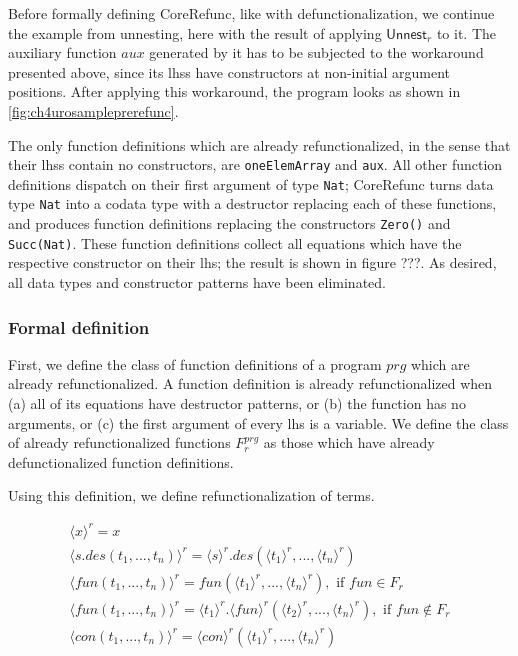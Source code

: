 Before formally defining \textsf{CoreRefunc}, like with defunctionalization, we continue the example from unnesting, here with the result of applying $\textsf{Unnest}_r$ to it. The auxiliary function $aux$ generated by it has to be subjected to the workaround presented above, since its lhss have constructors at non-initial argument positions. After applying this workaround, the program looks as shown in \autoref{fig:ch4urosampleprerefunc}.

The only function definitions which are already refunctionalized, in the sense that their lhss contain no constructors, are \texttt{oneElemArray} and \texttt{aux}. All other function definitions dispatch on their first argument of type \texttt{Nat}; \textsf{CoreRefunc} turns data type \texttt{Nat} into a codata type with a destructor replacing each of these functions, and produces function definitions replacing the constructors \texttt{Zero()} and \texttt{Succ(Nat)}. These function definitions collect all equations which have the respective constructor on their lhs; the result is shown in figure ???. As desired, all data types and constructor patterns have been eliminated.

\subsubsection{Formal definition}

First, we define the class of function definitions of a program $prg$ which are already refunctionalized. A function definition is already refunctionalized when (a) all of its equations have destructor patterns, or (b) the function has no arguments, or (c) the first argument of every lhs is a variable. We define the class of already refunctionalized functions $F^{prg}_r$ as those which have already defunctionalized function definitions.

Using this definition, we define refunctionalization of terms.

\begin{align*}
\langle x \rangle^r = x \\
\langle s.des(t_1, ..., t_n) \rangle^r = \langle s \rangle^r .des(\langle t_1 \rangle^r, ..., \langle t_n \rangle^r) \\
\langle fun(t_1, ..., t_n) \rangle^r = fun(\langle t_1 \rangle^r, ..., \langle t_n \rangle^r), \text{ if } fun \in F_r \\
\langle fun(t_1, ..., t_n) \rangle^r = \langle t_1 \rangle^r .\langle fun \rangle^r (\langle t_2 \rangle^r, ..., \langle t_n \rangle^r), \text{ if } fun \not\in F_r \\
\langle con(t_1, ..., t_n) \rangle^r = \langle con \rangle^r (\langle t_1 \rangle^r, ..., \langle t_n \rangle^r)
\end{align*}


